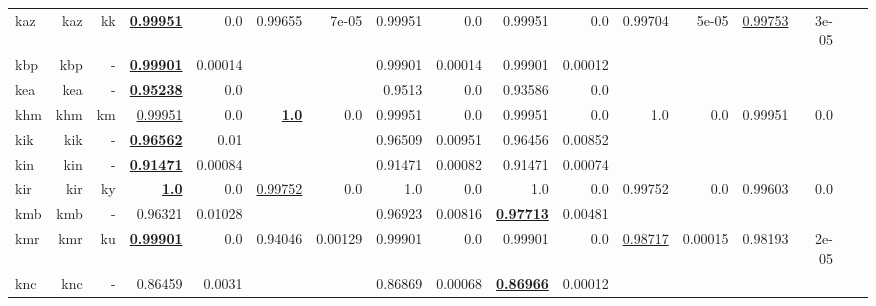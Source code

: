 \documentclass[11pt]{article}
\begin{document}
\begin{table*}[h]
{\begin{tabular}{lrrrrrrrrrrrrrrrr}
kaz         & kaz         & kk         & \textbf{\underline{0.99951}}         & 0.0         & 0.99655         & 7e-05         & 0.99951         & 0.0         & 0.99951         & 0.0         & 0.99704         & 5e-05         & \underline{0.99753}         & 3e-05         \\
kbp         & kbp         & -         & \textbf{\underline{0.99901}}         & 0.00014         &          &          & 0.99901         & 0.00014         & 0.99901         & 0.00012         &          &          &          &          \\
kea         & kea         & -         & \textbf{\underline{0.95238}}         & 0.0         &          &          & 0.9513         & 0.0         & 0.93586         & 0.0         &          &          &          &          \\
khm         & khm         & km         & \underline{0.99951}         & 0.0         & \textbf{\underline{1.0}}         & 0.0         & 0.99951         & 0.0         & 0.99951         & 0.0         & 1.0         & 0.0         & 0.99951         & 0.0         \\
kik         & kik         & -         & \textbf{\underline{0.96562}}         & 0.01         &          &          & 0.96509         & 0.00951         & 0.96456         & 0.00852         &          &          &          &          \\
kin         & kin         & -         & \textbf{\underline{0.91471}}         & 0.00084         &          &          & 0.91471         & 0.00082         & 0.91471         & 0.00074         &          &          &          &          \\
kir         & kir         & ky         & \textbf{\underline{1.0}}         & 0.0         & \underline{0.99752}         & 0.0         & 1.0         & 0.0         & 1.0         & 0.0         & 0.99752         & 0.0         & 0.99603         & 0.0         \\
kmb         & kmb         & -         & 0.96321         & 0.01028         &          &          & 0.96923         & 0.00816         & \textbf{\underline{0.97713}}         & 0.00481         &          &          &          &          \\
kmr         & kmr         & ku         & \textbf{\underline{0.99901}}         & 0.0         & 0.94046         & 0.00129         & 0.99901         & 0.0         & 0.99901         & 0.0         & \underline{0.98717}         & 0.00015         & 0.98193         & 2e-05         \\
knc         & knc         & -         & 0.86459         & 0.0031         &          &          & 0.86869         & 0.00068         & \textbf{\underline{0.86966}}         & 0.00012         &          &          &          &          \\

\end{tabular}}
\end{table*}
\end{document}
